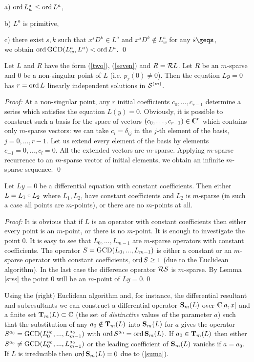 {{a) $\mathop{\rm ord} L_w^a \leq \mathop{\rm ord} L^a$,

b) $L^a$ is primitive,

c) there exist $s,k$ such that $x^sD^k \in L^a$ and
$x^{\tilde s}D^k \notin L_w^a$ for any ${\tilde s}\geqs$,\\
we obtain $ \mathop{\rm ord} \mathop{\rm GCD} (L_w^a,L^a)< \mathop{\rm ord} L^a$. \qed

\begin{Lemma}
\label{srss}
Let $L$ and $R$ have the form (\ref{two}), (\ref{seven}) and
$R={\cal R} L$. Let $R$ be an $m$-sparse and 0 be a non-singular point of $L$
(i.e. $p_r(0) \ne 0$). Then the equation $Ly=0$ has $r=\mathop{\rm ord} L$
linearly independent solutions in ${\cal S}^{(m)}$.
\end{Lemma}
{\em Proof:\/}
At a non-singular point, any $r$ initial
coefficients $c_0,\dots,c_{r-1}$ determine
a series which satisfies the equation $L(y)=0$.
Obviously, it is possible to construct such a basis for the space
of vectors $(c_0,\dots,c_{r-1})\in \complex ^r$ which contains only
$m$-sparse vectors: we can take $c_i=\delta _{ij}$ in the $j$-th
element of the basis, $j=0,...,r-1$. Let us  extend every element
of the basis by elements $c_{-1}=0,\dots,c_l=0$. All the extended
vectors are $m$-sparse.  Applying $m$-sparse recurrence to an
$m$-sparse vector of initial elements, we obtain an infinite
$m$-sparse sequence. \qed

\begin{Lemma}
\label{nsing}
Let $Ly=0$ be a differential equation with constant coefficients.
Then either $L=L_1\circ L_2$ where $L_1,L_2$, have constant
coefficients and $L_2$ is $m$-sparse (in such a case all points are
$m$-points), or there are no $m$-points at all.
\end{Lemma}
{\em Proof:\/}
It is obvious that if $L$ is an operator with constant
coefficients then either every point is an $m$-point, or there is no
$m$-point.  It is enough to investigate the point 0. It is easy to
see that $L_0,...,L_{m-1}$ are $m$-sparse operators with constant
coefficients. The operator $S=\mathop{\rm GCD}(L_0,...,L_{m-1})$ is either a
constant or an $m$-sparse operator with constant coefficients,
$\mathop{\rm ord} S \ge 1$ (due to the Euclidean algorithm).  In the last case the
difference operator ${\cal R}S$ is $m$-sparse.
By Lemma \ref{srss} the point 0 will be
an $m$-point of $Ly=0$.\qed

Using the (right) Euclidean algorithm and, for instance, the
differential resultant and subresultants \cite{Char91} we can
construct a differential operator ${\bf S}_m(L)$ over
$\complex [a,x]$ and a finite set ${\bf T}_m(L)\subset \complex$ (the
set of {\em distinctive} values of the parameter $a$) such that  the
substitution of any $a_0\notin {\bf T}_m(L)$ into ${\bf S}_m(L)$ for
$a$ gives the operator $S^{a_0}= \mathop{\rm GCD}(L_0^{a_0},...,L_{m-1}^{a_0})$
with $\mathop{\rm ord} S^{a_0}=\mathop{\rm ord} {\bf S}_m(L)$.
If $a_0\in {\bf T}_m(L)$ then either
$ S^{a_0} \neq \mathop{\rm GCD}(L_0^{a_0},...,L_{m-1}^{a_0})$
or the leading coefficient of ${\bf S}_m(L)$ vanichs if $a=a_0$.
If $L$ is irreducible then $\mathop{\rm ord} {\bf S}_m (L)=0$ due to
(\ref{suma}).

}}
